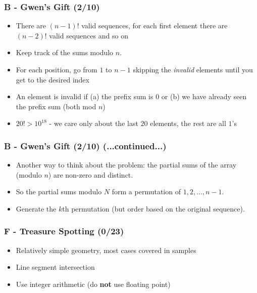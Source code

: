 \documentclass{beamer}
\begin{document}
\begin{frame}
\frametitle{B - Gwen's Gift (2/10)}
\begin{itemize}
\setlength\itemsep{0.5\baselineskip}
\item There are $(n-1)!$ valid sequences, for each first element there are $(n-2)!$ valid sequences and so on
\item Keep track of the sums modulo $n$.
\item For each position, go from $1$ to $n-1$ skipping the \textit{invalid} elements until you get to the desired index
\item An element is invalid if (a) the prefix sum is $0$ or (b) we have already seen the prefix sum (both mod $n$)
\item $20! > 10^{18}$ - we care only about the last $20$ elements, the rest are all $1$'s
\end{itemize}
\end{frame}


\begin{frame}
\frametitle{B - Gwen's Gift (2/10) (...continued...)}
\begin{itemize}
\setlength\itemsep{0.5\baselineskip}
\item Another way to think about the problem: the partial sums of the
  array (modulo $n$) are non-zero and distinct.
\item So the partial sums modulo $N$ form a permutation of $1, 2, \ldots, n-1$.
\item Generate the $k$th permutation (but order based on the original sequence).
\end{itemize}
\end{frame}

\begin{frame}
\frametitle{F - Treasure Spotting (0/23)}
\begin{itemize}
\setlength\itemsep{0.5\baselineskip}
\item Relatively simple geometry, most cases covered in samples
\item Line segment intersection
\item Use integer arithmetic (do \textbf{not} use floating point)
\end{itemize}
\end{frame}
\end{document}
